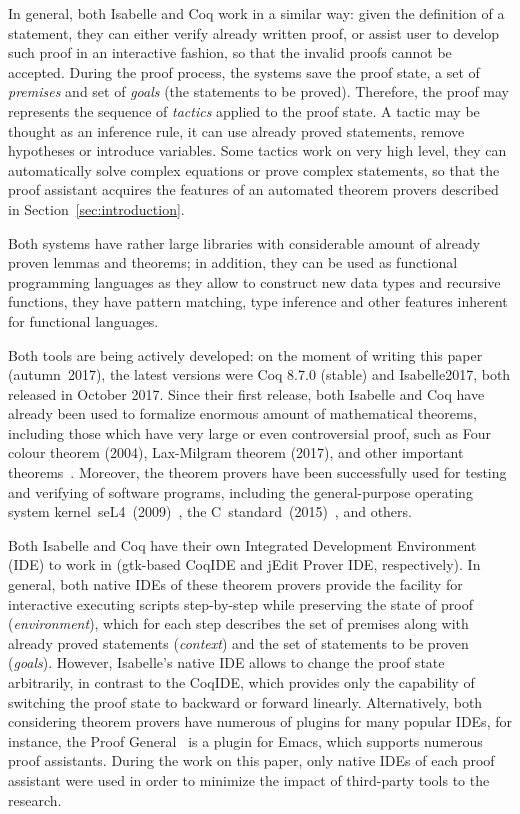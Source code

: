 \documentclass[article]{aaltoseries}
\begin{document}
In general, both Isabelle and Coq work in a similar way: given the definition of a statement, they can either verify already written proof, or assist user to develop such proof in an interactive fashion, so that the invalid proofs cannot be accepted.
During the proof process, the systems save the proof state, a set of \textit{premises} and set of \textit{goals} (the statements to be proved). Therefore, the proof may represents the sequence of \textit{tactics} applied to the proof state. A tactic may be thought as an inference rule, it can use already proved statements, remove hypotheses or introduce variables. Some tactics work on very high level, they can automatically solve complex equations or prove complex statements, so that the proof assistant acquires the features of an automated theorem provers described in Section~\ref{sec:introduction}.

Both systems have rather large libraries with considerable amount of already proven lemmas and theorems; in addition, they can be used as functional programming languages as they allow to construct new data types and recursive functions, they have pattern matching, type inference and other features inherent for functional languages.

Both tools are being actively developed: on the moment of writing this paper (autumn~2017), the latest versions were Coq 8.7.0 (stable) and Isabelle2017, both released in October 2017. Since their first release, both Isabelle and Coq have already been used to formalize enormous amount of mathematical theorems, including those which have very large or even controversial proof, such as Four colour theorem (2004), Lax-Milgram theorem (2017), and other important theorems~\cite{Wiedijk100}. Moreover, the theorem provers have been successfully used for testing and verifying of software programs, including the general-purpose operating system kernel~seL4~(2009)~\cite{Klein09}, the C~standard~(2015)~\cite{Krebbers15}, and others.

Both Isabelle and Coq have their own Integrated Development Environment (IDE) to work in (gtk-based CoqIDE and jEdit Prover IDE, respectively). In general, both native IDEs of these theorem provers provide the facility for interactive executing scripts step-by-step while preserving the state of proof (\textit{environment}), which for each step describes the set of premises along with already proved statements (\textit{context}) and the set of statements to be proven (\textit{goals}). However, Isabelle's native IDE allows to change the proof state arbitrarily, in contrast to the CoqIDE, which provides only the capability of switching the proof state to backward or forward linearly. Alternatively, both considering theorem provers have numerous of plugins for many popular IDEs, for instance, the Proof General~\cite{tool_PG} is a plugin for Emacs, which supports numerous proof assistants. During the work on this paper, only native IDEs of each proof assistant were used in order to minimize the impact of third-party tools to the research.
\end{document}
